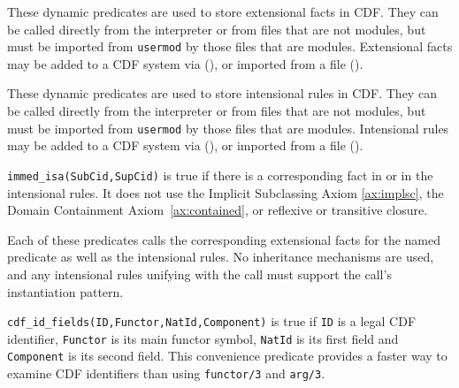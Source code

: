 \begin{description}
%
These dynamic predicates are used to store extensional facts in CDF.
They can be called directly from the interpreter or from files that
are not modules, but must be imported from {\tt usermod} by those
files that are modules.  Extensional facts may be added to a CDF system
via  (), or imported from a
 file ().

%
These dynamic predicates are used to store intensional rules in CDF.
They can be called directly from the interpreter or from files that
are not modules, but must be imported from {\tt usermod} by those
files that are modules.  Intensional rules may be added to a CDF
system via  (), or imported from
a  file ().


{\tt immed\_isa(SubCid,SupCid)} is true if there is a corresponding
fact in  or in the intensional rules.  It does not
use the Implicit Subclassing Axiom \ref{ax:implsc}, the Domain
Containment Axiom~\ref{ax:contained}, or reflexive or transitive
closure.

Each of these predicates calls the corresponding extensional facts for
the named predicate as well as the intensional rules.  No inheritance
mechanisms are used, and any intensional rules unifying with the call
must support the call's instantiation pattern.


{\tt cdf\_id\_fields(ID,Functor,NatId,Component)} is true if {\tt ID}
is a legal CDF identifier, {\tt Functor} is its main functor symbol,
{\tt NatId} is its first field and {\tt Component} is its second
field.  This convenience predicate provides a faster way to examine
CDF identifiers than using {\tt functor/3} and {\tt arg/3}.

\end{description}

